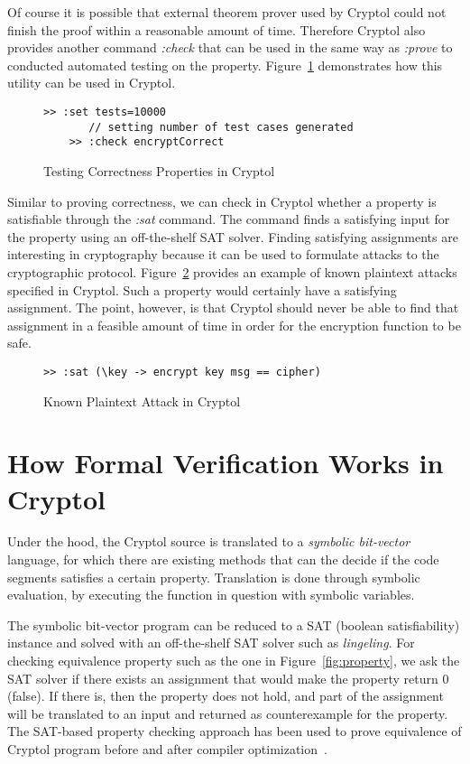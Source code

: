 \documentclass[a4paper, notitlepage]{report}
\begin{document}
Of course it is possible that external theorem prover used by Cryptol could
not finish the proof within a reasonable amount of time. Therefore Cryptol
also provides another command \emph{:check} that can be used in the same way
as \emph{:prove} to conducted automated testing on the property. Figure~\ref{fig:test}
demonstrates how this utility can be used in Cryptol.

\begin{figure}
  \begin{lstlisting}[frame=single]
    >> :set tests=10000
       // setting number of test cases generated 
    >> :check encryptCorrect
  \end{lstlisting}
  \caption{Testing Correctness Properties in Cryptol}
  \label{fig:test}
\end{figure}

Similar to proving correctness, we can check in Cryptol whether a property is
satisfiable through the \emph{:sat} command. The command finds a satisfying input
for the property using an off-the-shelf SAT solver. 
Finding satisfying assignments are interesting in cryptography because it can
be used to formulate attacks to the cryptographic protocol. Figure~\ref{fig:sat}
provides an example of known plaintext attacks specified in Cryptol.
Such a property would certainly have a satisfying assignment. The point, however,
is that Cryptol should never be able to find that assignment in a feasible amount
of time in order for the encryption function to be safe.

\begin{figure}
  \begin{lstlisting}[frame=single]
    >> :sat (\key -> encrypt key msg == cipher)
  \end{lstlisting}
  \caption{Known Plaintext Attack in Cryptol}
  \label{fig:sat}
\end{figure}

\section{How Formal Verification Works in Cryptol}

Under the hood, the Cryptol source is translated to a \emph{symbolic bit-vector} language,
for which there are existing methods that can the decide if the code segments satisfies
a certain property. Translation is done through symbolic evaluation,
by executing the function in question with symbolic variables.

The symbolic bit-vector program can be reduced to a SAT (boolean satisfiability)
instance and solved with an
off-the-shelf SAT solver such as \emph{lingeling}. For checking equivalence property
such as the one in Figure~\ref{fig:property}, we ask the SAT solver if there exists
an assignment that would make the property return 0 (false). If there is, then the
property does not hold, and part of the assignment will be translated to an input
and returned as counterexample for the property. The SAT-based property checking
approach has been used to prove equivalence of Cryptol program before and after
compiler optimization~\cite{erkok2009pragmatic}.
\end{document}
